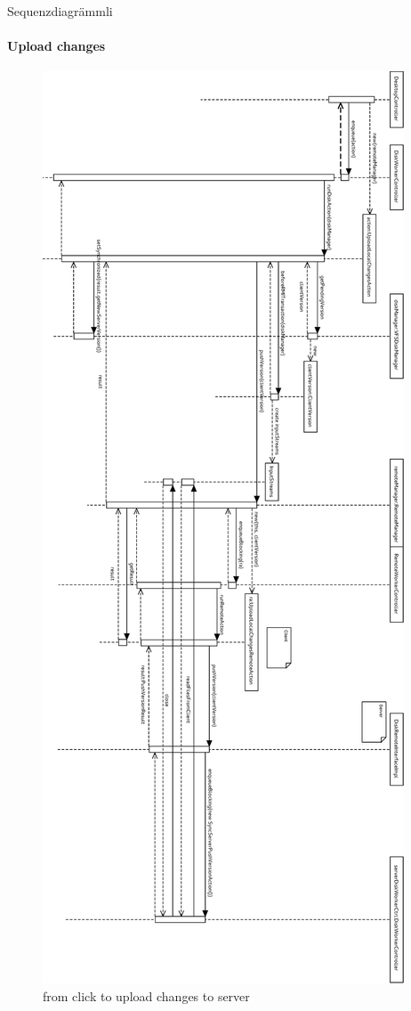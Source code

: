 Sequenzdiagrämmli
\paragraph{Upload changes}


\begin{figure}[h!]
\centering
\includegraphics[height=\textheight,width=\textwidth,keepaspectratio]{figures/22uploadChanges.eps}
\caption{from click to upload changes to server}
\label{fig:uploadChanges}
\end{figure}


